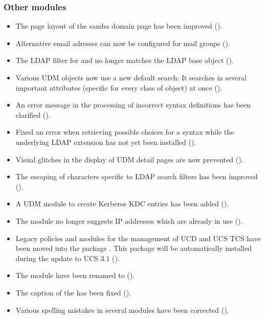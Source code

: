\subsubsection{Other modules}
\begin{itemize}
\item The page layout of the samba domain page has been improved ().

\item Alternative email adresses can now be configured for mail groups
  ().

\item The LDAP filter for  and
   no longer matches the LDAP base object
  ().

\item Various UDM objects now use a new default search: It searches in
  several important attributes (specific for every class of object) at
  once ().

\item An error message in the processing of incorrect syntax
  definitions has been clarified ().

\item Fixed an error when retrieving possible choices for a syntax while the
  underlying LDAP extension has not yet been installed ().

\item Visual glitches in the display of UDM detail pages are now
  prevented ().

\item The escaping of characters specific to LDAP search filters has
  been improved ().

\item A UDM module to create Kerberos KDC entries has been added
  ().

\item The  module no longer suggests IP addresses
  which are already in use ().

\item Legacy policies and \ucsUDM{} modules for the management of UCD and UCS
TCS have been moved into the package
. This
package will be automatically installed during the update to UCS 3.1 
().

\item The module  have been renamed to
   ().

\item The caption of the  has been
  fixed ().

\item Various spelling mistakes in several modules have been corrected
  ().

\end{itemize}

